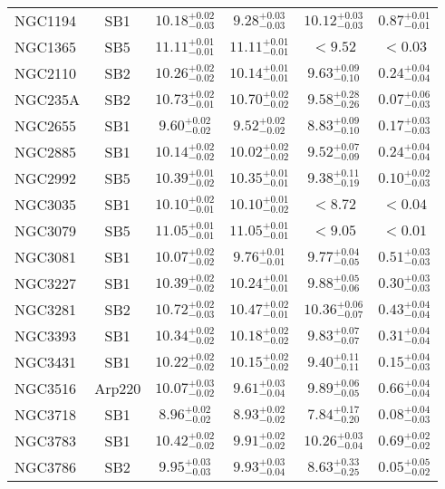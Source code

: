 \documentclass[onecolumn]{mn2e}
\begin{document}
{\begin{center}
\begin{longtable}{lccccc}
NGC1194 & SB1 & $10.18_{-0.03}^{+0.02}$ & $9.28_{-0.03}^{+0.03}$ & $10.12_{-0.03}^{+0.03}$ &$0.87_{-0.01}^{+0.01}$ \\
NGC1365 & SB5 & $11.11_{-0.01}^{+0.01}$ & $11.11_{-0.01}^{+0.01}$ & $<9.52$ &$<0.03$ \\
NGC2110 & SB2 & $10.26_{-0.02}^{+0.02}$ & $10.14_{-0.01}^{+0.01}$ & $9.63_{-0.10}^{+0.09}$ &$0.24_{-0.04}^{+0.04}$ \\
NGC235A & SB2 & $10.73_{-0.01}^{+0.02}$ & $10.70_{-0.02}^{+0.02}$ & $9.58_{-0.26}^{+0.28}$ &$0.07_{-0.03}^{+0.06}$ \\
NGC2655 & SB1 & $9.60_{-0.02}^{+0.02}$ & $9.52_{-0.02}^{+0.02}$ & $8.83_{-0.10}^{+0.09}$ &$0.17_{-0.03}^{+0.03}$ \\
NGC2885 & SB1 & $10.14_{-0.02}^{+0.02}$ & $10.02_{-0.02}^{+0.02}$ & $9.52_{-0.09}^{+0.07}$ &$0.24_{-0.04}^{+0.04}$ \\
NGC2992 & SB5 & $10.39_{-0.02}^{+0.01}$ & $10.35_{-0.01}^{+0.01}$ & $9.38_{-0.19}^{+0.11}$ &$0.10_{-0.03}^{+0.02}$ \\
NGC3035 & SB1 & $10.10_{-0.01}^{+0.02}$ & $10.10_{-0.02}^{+0.01}$ & $<8.72$ &$<0.04$ \\
NGC3079 & SB5 & $11.05_{-0.01}^{+0.01}$ & $11.05_{-0.01}^{+0.01}$ & $<9.05$ &$<0.01$ \\
NGC3081 & SB1 & $10.07_{-0.02}^{+0.02}$ & $9.76_{-0.01}^{+0.01}$ & $9.77_{-0.05}^{+0.04}$ &$0.51_{-0.03}^{+0.03}$ \\
NGC3227 & SB1 & $10.39_{-0.02}^{+0.02}$ & $10.24_{-0.01}^{+0.01}$ & $9.88_{-0.06}^{+0.05}$ &$0.30_{-0.03}^{+0.03}$ \\
NGC3281 & SB2 & $10.72_{-0.03}^{+0.02}$ & $10.47_{-0.01}^{+0.02}$ & $10.36_{-0.07}^{+0.06}$ &$0.43_{-0.04}^{+0.04}$ \\
NGC3393 & SB1 & $10.34_{-0.02}^{+0.02}$ & $10.18_{-0.02}^{+0.02}$ & $9.83_{-0.07}^{+0.07}$ &$0.31_{-0.04}^{+0.04}$ \\
NGC3431 & SB1 & $10.22_{-0.02}^{+0.02}$ & $10.15_{-0.02}^{+0.02}$ & $9.40_{-0.11}^{+0.11}$ &$0.15_{-0.03}^{+0.04}$ \\
NGC3516 & Arp220 & $10.07_{-0.02}^{+0.03}$ & $9.61_{-0.04}^{+0.03}$ & $9.89_{-0.05}^{+0.06}$ &$0.66_{-0.04}^{+0.04}$ \\
NGC3718 & SB1 & $8.96_{-0.02}^{+0.02}$ & $8.93_{-0.02}^{+0.02}$ & $7.84_{-0.20}^{+0.17}$ &$0.08_{-0.03}^{+0.04}$ \\
NGC3783 & SB1 & $10.42_{-0.02}^{+0.02}$ & $9.91_{-0.02}^{+0.02}$ & $10.26_{-0.04}^{+0.03}$ &$0.69_{-0.02}^{+0.02}$ \\
NGC3786 & SB2 & $9.95_{-0.03}^{+0.03}$ & $9.93_{-0.04}^{+0.03}$ & $8.63_{-0.25}^{+0.33}$ &$0.05_{-0.02}^{+0.05}$ \\

\end{longtable}
\end{center}}
\end{document}
